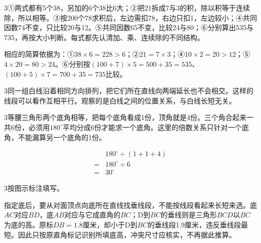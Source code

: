 \documentclass[multi=snippet,border={5bp 20bp 5bp 5bp}]{standalone}
\newenvironment{snippet}[3]{\begin{minipage}{#1bp}\color{answerred}\fontsize{#2}{#3}\selectfont\raggedright}{\end{minipage}}
\begin{document}
\begin{snippet}{505}{11.5}{14}\begin{multicols}{3}\raggedcolumns ①两式都有5个38，另加的6个38比6大；②把21拆成7与3的积，除以积等于连续除，所以相等。③按200个78求积后，左边需扣78，右边只扣1，左边较小；④共同因数74不变，只比较20与12。⑤共同因数65不变，比较24与80；⑥分别算出535与735，再按大小判断。每式都先认清加、乘、连续除的不同结构。\par 相应的简算依据为：①\(38\times6=228>6\)\allowbreak ；②\(21=7\times3\)\allowbreak ；④\(10\times2=20>12\)\allowbreak ；⑤\(4\times20=80>24\)\allowbreak 。⑥分别按\((100+7)\times5=500+35=535\)\allowbreak 、\((100+5)\times7=700+35=735\)\allowbreak 比较。\end{multicols}\end{snippet}
\begin{snippet}{505}{11.5}{14}\begin{multicols}{3}\raggedcolumns 同一组白线沿着相同方向排列，把它们所在直线向两端延长也不会相交。这样的线段可以看作互相平行。观察的是白线之间的位置关系，与白线长短无关。\end{multicols}\end{snippet}
\begin{snippet}{505}{11.5}{14}\begin{multicols}{3}\raggedcolumns 等腰三角形两个底角相等，把每个底角看成1份，顶角就是4份。三个角合起来一共6份，必须用\(180^\circ\)\allowbreak 平均分成6份才能求一个底角。这里的倍数关系只针对一个底角，不能漏算另一个底角的1份。\par \[\begin{aligned}&180^\circ\div(1+1+4)\\={}&180^\circ\div6\\={}&30^\circ\end{aligned}\]\end{multicols}\end{snippet}
\begin{snippet}{505}{11.5}{14}\begin{multicols}{3}\raggedcolumns 按图示标注填写。\par 指定底后，要从对面顶点向底所在直线找垂线段，不能按线段看起来长短来选。底\(AC\)\allowbreak 对应\(BD\)\allowbreak ，底\(AB\)\allowbreak 对应与它成直角的\(BC\)\allowbreak ；D到\(BC\)\allowbreak 的垂线则是三角形\(BCD\)\allowbreak 以\(BC\)\allowbreak 为底的高。原标\(DB=1.8\)\allowbreak 厘米，却小于D到\(BC\)\allowbreak 的垂线段1.9厘米，违反垂线段最短。因此只按原直角标记识别所填底高，冲突尺寸应核实，不再据此推算。\end{multicols}\end{snippet}
\end{document}
